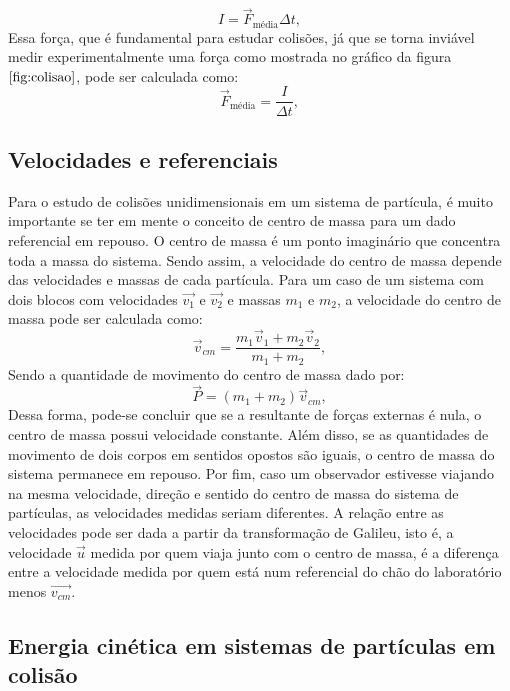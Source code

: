 \documentclass[12pt, twoside]{article}
\begin{document}
\begin{equation}
\label{eq:Impulso}
I = \vec{F}_{\text{média}} \Delta t,
\end{equation}
Essa força, que é fundamental para estudar colisões, já que se torna inviável medir experimentalmente uma força como mostrada no gráfico da figura $\ref{fig:colisao}$, pode ser calculada como:
\begin{equation}
\label{eq:Forca_media}
\vec{F}_{\text{média}} = \frac{I}{\Delta t},
\end{equation}

\subsection{Velocidades e referenciais}
\label{referencial}

Para o estudo de colisões unidimensionais em um sistema de partícula, é muito importante se ter em mente o conceito de centro de massa para um dado referencial em repouso. O centro de massa é um ponto imaginário que concentra toda a massa do sistema. Sendo assim, a velocidade do centro de massa depende das velocidades e massas de cada partícula. Para um caso de um sistema com dois blocos com velocidades $\vec{v_1}$ e $\vec{v_2}$ e massas $m_1$ e $m_2$, a velocidade do centro de massa pode ser calculada como:
\begin{equation}
\label{eq:Velcidade_centro_de_massa}
\vec{v}_{cm} = \frac{m_1\vec{v}_1 + m_2\vec{v}_2}{m_1 + m_2},
\end{equation}
Sendo a quantidade de movimento do centro de massa dado por:
\begin{equation}
\label{eq:Quantidade_de_movimento_centro_de_massa}
\vec{P} = (m_1 + m_2) \vec{v}_{cm},
\end{equation}
Dessa forma, pode-se concluir que se a resultante de forças externas é nula, o centro de massa possui velocidade constante. Além disso, se as quantidades de movimento de dois corpos em sentidos opostos são iguais, o centro de massa do sistema permanece em repouso. 
Por fim, caso um observador estivesse viajando na mesma velocidade, direção e sentido do centro de massa do sistema de partículas, as velocidades medidas seriam diferentes. A relação entre as velocidades pode ser dada a partir da transformação de Galileu, isto é, a velocidade $\vec{u}$ medida por quem viaja junto com o centro de massa,  é a diferença entre a velocidade medida por quem está num referencial do chão do laboratório menos $\vec{v_{cm}}$.

\subsection{Energia cinética em sistemas de partículas em colisão}
\end{document}
